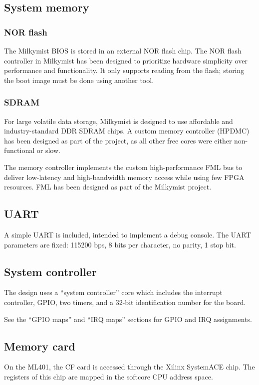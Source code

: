 \documentclass[a4paper,11pt]{article}
\begin{document}
\subsection{System memory}
\subsubsection{NOR flash}
The Milkymist BIOS is stored in an external NOR flash chip. The NOR flash controller in Milkymist has been designed to prioritize hardware simplicity over performance and functionality. It only supports reading from the flash; storing the boot image must be done using another tool.

\subsubsection{SDRAM}
For large volatile data storage, Milkymist is designed to use affordable and industry-standard DDR SDRAM chips. A custom memory controller (HPDMC) has been designed as part of the project, as all other free cores were either non-functional or slow.

The memory controller implements the custom high-performance FML bus to deliver low-latency and high-bandwidth memory access while using few FPGA resources. FML has been designed as part of the Milkymist project.

\subsection{UART}
A simple UART is included, intended to implement a debug console. The UART parameters are fixed: 115200 bps, 8 bits per character, no parity, 1 stop bit.

\subsection{System controller}
The design uses a ``system controller'' core which includes the interrupt controller, GPIO, two timers, and a 32-bit identification number for the board.

See the ``GPIO maps'' and ``IRQ maps'' sections for GPIO and IRQ assignments.

\subsection{Memory card}
On the ML401, the CF card is accessed through the Xilinx SystemACE chip. The registers of this chip are mapped in the softcore CPU address space.
\end{document}
